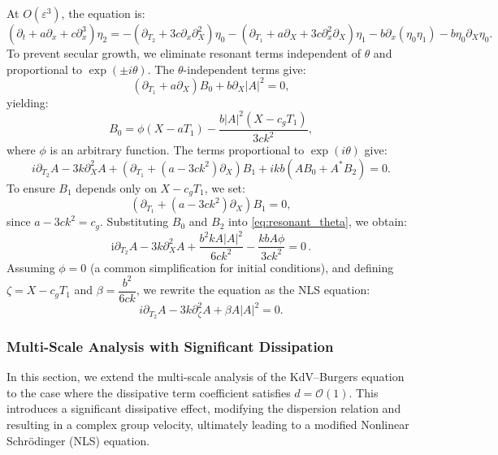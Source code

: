 \documentclass[alpha-refs, 12pt]{wiley-article}
\renewcommand{\O}{\mathcal{O}}
\newcommand{\ui}{\mathrm{i}}
\newcommand{\eps}{\varepsilon}
\begin{document}
At $O(\eps^3)$, the equation is:
\begin{equation}\label{eq:third_order}
  \left( \partial_t + a \partial_x + c \partial_x^3 \right) \eta_2 = - \left( \partial_{T_2} + 3 c \partial_x \partial_X^2 \right) \eta_0 - \left( \partial_{T_1} + a \partial_X + 3 c \partial_x^2 \partial_X \right) \eta_1 - b \partial_x ( \eta_0 \eta_1 ) - b \eta_0 \partial_X \eta_0.
\end{equation}
To prevent secular growth, we eliminate resonant terms independent of $\theta$ and proportional to $\exp(\pm i \theta)$. The $\theta$-independent terms give:
\begin{equation}\label{eq:B0_equation}
  \left( \partial_{T_1} + a \partial_X \right) B_0 + b \partial_X |A|^2 = 0,
\end{equation}
yielding:
\[
B_0 = \phi(X - a T_1) - \frac{b |A|^2 (X - c_g T_1)}{3 c k^2},
\]
where $\phi$ is an arbitrary function. The terms proportional to $\exp(i \theta)$ give:
\begin{equation}
\label{eq:resonant_theta}
i \partial_{T_2} A - 3 k \partial_X^2 A + \left( \partial_{T_1} + (a - 3 c k^2) \partial_X \right) B_1 + i k b \left( A B_0 + A^* B_2 \right) = 0.
\end{equation}
To ensure $B_1$ depends only on $X - c_g T_1$, we set:
\[
\left( \partial_{T_1} + (a - 3 c k^2) \partial_X \right) B_1 = 0,
\]
since $a - 3 c k^2 = c_g$. Substituting $B_0$ and $B_2$ into \eqref{eq:resonant_theta}, we obtain:
\begin{equation*}%
  \ui \partial_{T_2} A - 3 k \partial_X^2 A + \frac{b^2 k A |A|^2}{6 c k^2} - \frac{k b A \phi}{3 c k^2} = 0\,.
\end{equation*}
Assuming $\phi = 0$ (a common simplification for initial conditions), and defining $\zeta = X - c_g T_1$ and $\beta = \dfrac{b^2}{6 c k}$, we rewrite the equation as the NLS equation:
\begin{equation}\label{eq:NLS_final}
  i \partial_{T_2} A - 3 k \partial_\zeta^2 A + \beta A |A|^2 = 0.
\end{equation}

\subsubsection{Multi-Scale Analysis with Significant Dissipation}

In this section, we extend the multi-scale analysis of the KdV--Burgers equation to the case where the dissipative term coefficient satisfies $d = \O(1)$. This introduces a significant dissipative effect, modifying the dispersion relation and resulting in a complex group velocity, ultimately leading to a modified Nonlinear Schr\"odinger (NLS) equation.
\end{document}
